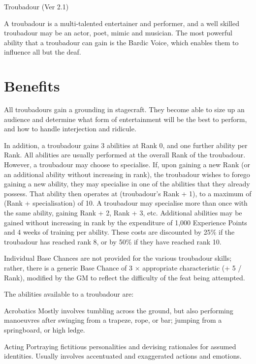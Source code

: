 \begin{Chapter}{Troubadour (Ver 2.1)}

A troubadour is a multi-talented entertainer and performer, and a well
skilled troubadour may be an actor, poet, mimic and musician. The most
powerful ability that a troubadour can gain is the Bardic Voice,
which enables them to influence all but the deaf.

\section{Benefits}
All troubadours gain a grounding in stagecraft.  They become able to
size up an audience and determine what form of entertainment will be
the best to perform, and how to handle interjection and ridicule.

In addition, a troubadour gains 3 abilities at Rank 0, and one further
ability per Rank. All abilities are usually performed at the overall
Rank of the troubadour.  However, a troubadour may choose to
specialise.  If, upon gaining a new Rank (or an additional ability
without increasing in rank), the troubadour wishes to forego gaining a
new ability, they may specialise in one of the abilities that they
already possess. That ability then operates at (troubadour’s Rank +
1), to a maximum of (Rank + specialisation) of 10.  A troubadour may
specialise more than once with the same ability, gaining Rank + 2,
Rank + 3, etc.  Additional abilities may be gained without increasing
in rank by the expenditure of 1,000 Experience Points and 4 weeks of
training per ability.  These costs are discounted by 25\% if the
troubadour has reached rank 8, or by 50\% if they have reached rank
10.

Individual Base Chances are not provided for the various troubadour
skills; rather, there is a generic Base Chance of 3 × appropriate
characteristic (+ 5 / Rank), modified by the GM to reflect the
difficulty of the feat being attempted.

The abilities available to a troubadour are:

\begin{Description}
\item[Acrobatics] Mostly involves tumbling across the ground, but also
  performing manoeuvres after swinging from a trapeze, rope, or bar;
  jumping from a springboard, or high ledge.

\item[Acting] Portraying fictitious personalities and devising
  rationales for assumed identities.  Usually involves accentuated and
  exaggerated actions and emotions.


\end{Description}
\end{Chapter}
